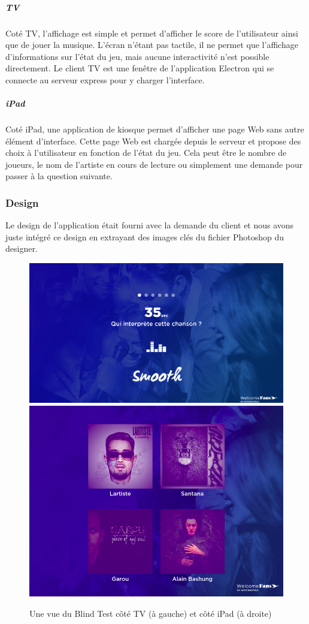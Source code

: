 \subparagraph{TV} Coté TV, l'affichage est simple et permet d'afficher le score de l'utilisateur ainsi que de jouer la musique.
L'écran n'étant pas tactile, il ne permet que l'affichage d'informations sur l'état du jeu, mais aucune interactivité n'est possible directement.
Le client TV est une fenêtre de l'application Electron qui se connecte au serveur express pour y charger l'interface.

\subparagraph{iPad} Coté iPad, une application de kiosque permet d'afficher une page Web sans autre élément d'interface.
Cette page Web est chargée depuis le serveur et propose des choix à l'utilisateur en fonction de l'état du jeu.
Cela peut être le nombre de joueurs, le nom de l'artiste en cours de lecture ou simplement une demande pour passer à la question suivante.

\subsubsection{Design}

Le design de l'application était fourni avec la demande du client et nous avons juste intégré ce design en extrayant des images clés du fichier Photoshop du designer.

\begin{figure}[h]
    \centering
    \includegraphics[scale=0.23]{img/blind-test-tv.png}
    \includegraphics[scale=0.22]{img/blind-test-ipad.png}
    \caption{Une vue du Blind Test côté TV (à gauche) et côté iPad (à droite)}
\end{figure}

